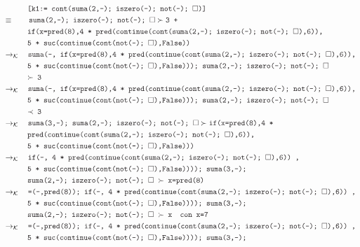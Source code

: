 \documentclass{article}
\newcommand{\tx}[1]{\textcolor{Black} {\texttt{#1}}}
\newcommand{\es}{$\square$}
\newcommand{\pop}[2]{ \tx{#1} \succ \tx{#2}}
\newcommand{\kr}{\rightarrow_{\mathcal{K}} \quad}
\begin{document}
\begin{enumerate}
\begin{enumerate}
\begin{align*}
			&\tx{\quad \quad \quad [k1:= cont(suma(2,-); iszero(-); not(-); \es)]}\\
			& \equiv \quad \quad \pop{suma(2,-); iszero(-); not(-); \es}{3 +}\\
			&\tx{\quad \quad \quad if(x=pred(8),4 * pred(continue(cont(suma(2,-); iszero(-); not(-); \es),6)),}\\
			&\tx{\quad \quad \quad 5 * suc(continue(cont(not(-); \es),False))}\\
			& \kr \tx{suma(-, if(x=pred(8),4 * pred(continue(cont(suma(2,-); iszero(-); not(-); \es),6)),}\\
			&\tx{\quad \quad \quad5 * suc(continue(cont(not(-); \es),False))); suma(2,-); iszero(-); not(-); \es}\\
			&\tx{\quad \quad \quad $\succ$ 3}\\
			& \kr \tx{suma(-, if(x=pred(8),4 * pred(continue(cont(suma(2,-); iszero(-); not(-); \es),6)),}\\
			&\tx{\quad \quad \quad 5 * suc(continue(cont(not(-); \es),False))); suma(2,-); iszero(-); not(-); \es}\\
			&\tx{\quad \quad \quad $\prec$ 3}\\
			&\kr \pop{suma(3,-); suma(2,-); iszero(-); not(-); \es}{if(x=pred(8),4 *}\\
			&\tx{\quad \quad \quad pred(continue(cont(suma(2,-); iszero(-); not(-); \es),6)),}\\
			&\tx{\quad \quad \quad 5 * suc(continue(cont(not(-); \es),False)))}\\
			&\kr \tx{if(-, 4 * pred(continue(cont(suma(2,-); iszero(-); not(-); \es),6)) ,}\\
			&\tx {\quad \quad \quad 5 * suc(continue(cont(not(-); \es),False)))); suma(3,-);}\\
			&\tx{\quad \quad \quad suma(2,-); iszero(-); not(-); \es $\ \succ $ x=pred(8)}\\
			&\kr \tx{=(-,pred(8)); if(-, 4 * pred(continue(cont(suma(2,-); iszero(-); not(-); \es),6)) ,}\\
			&\tx {\quad \quad \quad 5 * suc(continue(cont(not(-); \es),False)))); suma(3,-);}\\
			&\tx{\quad \quad \quad suma(2,-); iszero(-); not(-); \es $\ \succ $ x} \tx{\quad con x=7}\\	
			&\kr \tx{=(-,pred(8)); if(-, 4 * pred(continue(cont(suma(2,-); iszero(-); not(-); \es),6)) ,}\\
			&\tx {\quad \quad \quad 5 * suc(continue(cont(not(-); \es),False)))); suma(3,-);}\\

\end{align*}
\end{enumerate}
\end{enumerate}
\end{document}

